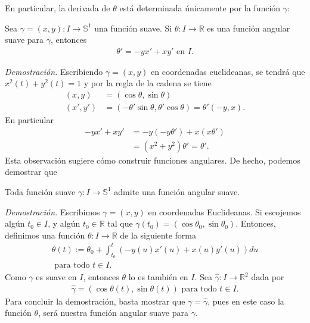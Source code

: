 \documentclass[oneside,11pt]{memoir}
\begin{document}
En particular, la derivada de $\theta$ está determinada únicamente por la función $\gamma$:
\begin{lemma}
    Sea $\gamma=(x,y):I\to \mathbb{S}^1$ una función suave. Si $\theta:I\to \mathbb{R}$ es una función angular suave para $\gamma$, entonces
    \begin{align*}
    \theta'=-yx'+xy' \text{ en }I.
\end{align*}
\end{lemma}
\textit{Demostración.} Escribiendo $\gamma=(x,y)$ en coordenadas euclideanas, se tendrá que $x^2(t)+y^2(t)=1$ y por la regla de la cadena se tiene
\begin{align*}
    (x,y)&=(\cos \theta, \sin\theta)\\ (x',y')&=(-\theta'\sin\theta,\theta'\cos\theta)=\theta'(-y,x).
\end{align*}
En particular
\begin{align*}
    -yx'+xy'&=-y(-y\theta')+x(x\theta')\\
    &=(x^2+y^2)\theta'=\theta'.
\end{align*}
Esta observación sugiere cómo construir funciones angulares. De hecho, podemos demostrar
que
\begin{proposition}
    Toda función suave $\gamma:I\to\mathbb{S}^1$ admite una función angular suave.
    \label{existfangular}
\end{proposition}
\textit{Demostración.} Escribimos $\gamma=(x,y)$ en coordenadas Euclideanas. Si escojemos algún $t_0\in I$, y algún $t_0\in \mathbb{R}$ tal que $\gamma(t_0)=(\cos\theta_0,\sin\theta_0)$. Entonces, definimos una función $\theta:I\to\mathbb{R}$ de la siguiente forma
\begin{align*}
    \theta(t):=\theta_0+\int_{t_0}^t(-y(u)x'(u)+x(u)y'(u))du\\ \text{ para todo }t\in I.
\end{align*}
Como $\gamma$ es suave en $I$, entonces $\theta$ lo es también en $I$. Sea $\hat{\gamma}:I\to\mathbb{R}^2$ dada por 
\begin{align*}
    \hat{\gamma}=(\cos \theta(t), \sin\theta(t)) \text{ para todo }t\in I.
\end{align*}
Para concluir la demostración, basta mostrar que $\gamma=\hat{\gamma}$, pues en este caso la función 
$\theta$, será nuestra función angular suave para $\gamma$. 
\end{document}
